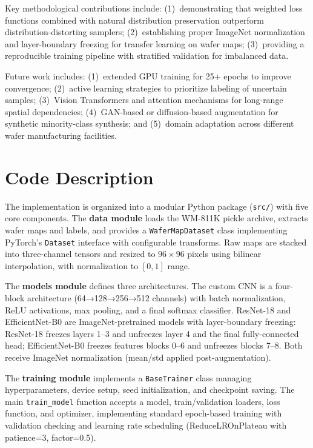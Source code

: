 \documentclass[conference]{IEEEtran}
\begin{document}
Key methodological contributions include: (1)~demonstrating that weighted loss
functions combined with natural distribution preservation outperform
distribution-distorting samplers; (2)~establishing proper ImageNet normalization
and layer-boundary freezing for transfer learning on wafer maps; (3)~providing
a reproducible training pipeline with stratified validation for imbalanced data.

Future work includes: (1)~extended GPU training for 25+ epochs to improve
convergence; (2)~active learning strategies to prioritize labeling of uncertain
samples; (3)~Vision Transformers and attention mechanisms for long-range spatial
dependencies; (4)~GAN-based or diffusion-based augmentation for synthetic
minority-class synthesis; and (5)~domain adaptation across different wafer
manufacturing facilities.

\section{Code Description}
\label{sec:code}

The implementation is organized into a modular Python package (\texttt{src/})
with five core components. The \textbf{data module} loads the WM-811K pickle
archive, extracts wafer maps and labels, and provides a \texttt{WaferMapDataset}
class implementing PyTorch's \texttt{Dataset} interface with configurable
transforms. Raw maps are stacked into three-channel tensors and resized to
$96 \times 96$ pixels using bilinear interpolation, with normalization to
$[0, 1]$ range.

The \textbf{models module} defines three architectures. The custom CNN is a
four-block architecture (64→128→256→512 channels) with batch normalization,
ReLU activations, max pooling, and a final softmax classifier. ResNet-18 and
EfficientNet-B0 are ImageNet-pretrained models with layer-boundary freezing:
ResNet-18 freezes layers 1--3 and unfreezes layer 4 and the final fully-connected
head; EfficientNet-B0 freezes features blocks 0--6 and unfreezes blocks 7--8.
Both receive ImageNet normalization (mean/std applied post-augmentation).

The \textbf{training module} implements a \texttt{BaseTrainer} class managing
hyperparameters, device setup, seed initialization, and checkpoint saving. The
main \texttt{train\_model} function accepts a model, train/validation loaders,
loss function, and optimizer, implementing standard epoch-based training with
validation checking and learning rate scheduling (ReduceLROnPlateau with
patience=3, factor=0.5).
\end{document}
